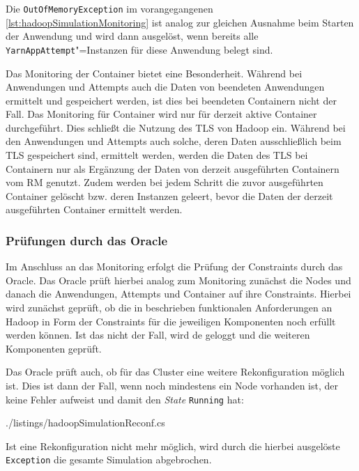Die \texttt{OutOfMemoryException} im vorangegangenen \autoref{lst:hadoopSimulationMonitoring} ist analog zur gleichen Ausnahme beim Starten der Anwendung und wird dann ausgelöst, wenn bereits alle \texttt{YarnAppAttempt}"=Instanzen für diese Anwendung belegt sind.

Das Monitoring der Container bietet eine Besonderheit.
Während bei Anwendungen und Attempts auch die Daten von beendeten Anwendungen ermittelt und gespeichert werden, ist dies bei beendeten Containern nicht der Fall.
Das Monitoring für Container wird nur für derzeit aktive Container durchgeführt.
Dies schließt die Nutzung des \ac{TLS} von Hadoop ein.
Während bei den Anwendungen und Attempts auch solche, deren Daten ausschließlich beim \ac{TLS} gespeichert sind, ermittelt werden, werden die Daten des \ac{TLS} bei Containern nur als Ergänzung der Daten von derzeit ausgeführten Containern vom \ac{RM} genutzt.
Zudem werden bei jedem Schritt die zuvor ausgeführten Container gelöscht bzw. deren Instanzen geleert, bevor die Daten der derzeit ausgeführten Container ermittelt werden.

\subsubsection{Prüfungen durch das Oracle}
\label{sec:simulationOracle}

Im Anschluss an das Monitoring erfolgt die Prüfung der Constraints durch das Oracle.
Das Oracle prüft hierbei analog zum Monitoring zunächst die Nodes und danach die Anwendungen, Attempts und Container auf ihre Constraints.
Hierbei wird zunächst geprüft, ob die in  beschrieben funktionalen Anforderungen an Hadoop in Form der Constraints für die jeweiligen Komponenten noch erfüllt werden können.
Ist das nicht der Fall, wird de geloggt und die weiteren Komponenten geprüft.

Das Oracle prüft auch, ob für das Cluster eine weitere Rekonfiguration möglich ist.
Dies ist dann der Fall, wenn noch mindestens ein Node vorhanden ist, der keine Fehler aufweist und damit den \emph{State} \texttt{Running} hat:


{./listings/hadoopSimulationReconf.cs}

Ist eine Rekonfiguration nicht mehr möglich, wird durch die hierbei ausgelöste \texttt{Exception} die gesamte Simulation abgebrochen.

